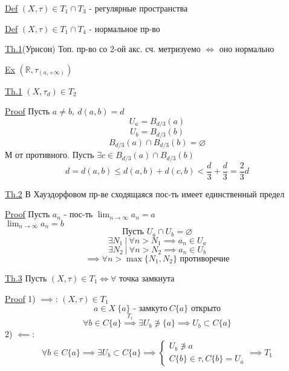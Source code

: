 \documentclass[a4paper]{article}
\begin{document}
\begin{tcolorbox}
\underline{Def} $ (X, \tau) \in T_1 \cap T_3 $ - регулярные пространства
\end{tcolorbox}

\begin{tcolorbox}
\underline{Def} $ (X, \tau) \in T_1 \cap T_4 $ - нормальное пр-во
\end{tcolorbox}

\begin{tcolorbox}
\underline{Th.1}(Урнсон) Топ. пр-во со 2-ой акс. сч. метризуемо $ \iff $ оно нормально
\end{tcolorbox}

\underline{Ex} $ (\mathbb{R}, \tau_{(a, +\infty)}) $ 

\begin{tcolorbox}
\underline{Th.1} $ (X, \tau_d) \in T_2 $ 

\underline{Proof} Пусть $ a \neq b, \ d(a,b) = d $ 
\[
    U_a = B_{d/3}(a)
\]
\[
    U_b = B_{d/3}(b)
\]
\[
    B_{d/3}(a) \cap B_{d/3}(b) = \varnothing
\]
М от противного. Пусть $ \exists c \in B_{d/3}(a) \cap B_{d/3}(b) $ 
\[
    d = d(a,b) \leq d(a,b) + d(c,b) < \frac{d}{3} + \frac{d}{3} = \frac{2}{3} d 
\]
\end{tcolorbox}

\begin{tcolorbox}
\underline{Th.2} В Хауздорфовом пр-ве сходящаяся пос-ть имеет единственный предел

\underline{Proof} Пусть $ a_n $ - пос-ть $ \lim_{n \to \infty} a_n = a $\\
$ \lim_{n \to \infty} a_n = b $ 
\[
    \text{Пусть } U_a \cap U_b = \varnothing
\]
\[
    \exists N_1 \ | \ \forall n > N_1 \implies a_n \in U_a
\]
\[
    \exists N_2 \ | \ \forall n > N_2 \implies a_n \in U_b
\]
\[
    \implies \forall n > \max\{ N_1, N_2 \} \text{ противоречие}
\]
\end{tcolorbox}

\begin{tcolorbox}
\underline{Th.3} Пусть $ (X,\tau) \in T_1 \iff \forall $ точка замкнута

\underline{Proof} 1) $ \implies $: $ (X, \tau) \in T_1 $ 
\[
    a \in X \ \{ a \} \text{ - замкуто} \ C\{a\} \text{ открыто}
\]
\[
    \forall b \in C\{a\} \stackrel{T_1}{\implies} \exists U_b \not\ni \{a\}
    \implies U_b \subset C\{a\}
\]
2) $ \impliedby $:
\[
    \forall b \in C\{a\} \implies \exists U_b \subset C\{a\} \implies
    \begin{cases}
        U_b \not\ni a\\
        C\{b\} \in \tau, C\{b\} = U_a
    \end{cases}
    \implies T_1
\]
\end{tcolorbox}
\end{document}
